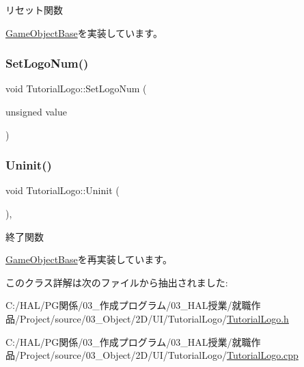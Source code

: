 リセット関数 



\mbox{\hyperlink{class_game_object_base_a85c59554f734bcb09f1a1e18d9517dce}{Game\+Object\+Base}}を実装しています。

\mbox{\label{class_tutorial_logo_a18313074bc7242f5e8a9121414abd51d}} 
\subsubsection{\texorpdfstring{Set\+Logo\+Num()}{SetLogoNum()}}
{\footnotesize\ttfamily void Tutorial\+Logo\+::\+Set\+Logo\+Num (\begin{DoxyParamCaption}\item[{unsigned}]{value }\end{DoxyParamCaption})\hspace{0.3cm}{\ttfamily [inline]}}

\mbox{\label{class_tutorial_logo_a8e1f1dba47dadf7d1bb40f616324ffb5}} 
\subsubsection{\texorpdfstring{Uninit()}{Uninit()}}
{\footnotesize\ttfamily void Tutorial\+Logo\+::\+Uninit (\begin{DoxyParamCaption}{ }\end{DoxyParamCaption})\hspace{0.3cm}{\ttfamily [override]}, {\ttfamily [virtual]}}



終了関数 



\mbox{\hyperlink{class_game_object_base_a97e1bc277d7b1c0156d4735de29a022c}{Game\+Object\+Base}}を再実装しています。



このクラス詳解は次のファイルから抽出されました\+:\begin{DoxyCompactItemize}
\item 
C\+:/\+H\+A\+L/\+P\+G関係/03\+\_\+作成プログラム/03\+\_\+\+H\+A\+L授業/就職作品/\+Project/source/03\+\_\+\+Object/2\+D/\+U\+I/\+Tutorial\+Logo/\mbox{\hyperlink{_tutorial_logo_8h}{Tutorial\+Logo.\+h}}\item 
C\+:/\+H\+A\+L/\+P\+G関係/03\+\_\+作成プログラム/03\+\_\+\+H\+A\+L授業/就職作品/\+Project/source/03\+\_\+\+Object/2\+D/\+U\+I/\+Tutorial\+Logo/\mbox{\hyperlink{_tutorial_logo_8cpp}{Tutorial\+Logo.\+cpp}}\end{DoxyCompactItemize}
